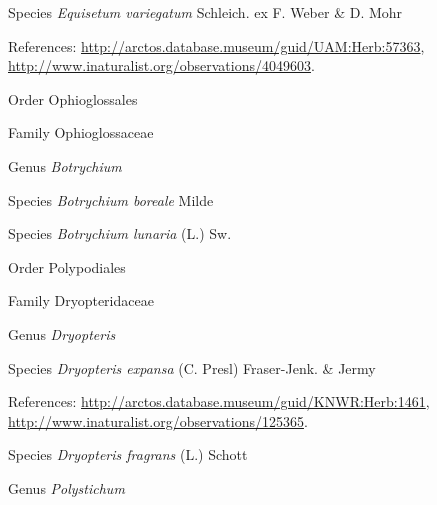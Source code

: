 \documentclass[9pt, article]{memoir}
\begin{document}
\begin{multicols}{2}
\vspace{6pt}\noindent\hspace{36pt}Species \textit{Equisetum variegatum} Schleich. ex F. Weber \& D. Mohr


\vspace{6pt}References: 
\url{http://arctos.database.museum/guid/UAM:Herb:57363}, 
\url{http://www.inaturalist.org/observations/4049603}.

\vspace{6pt}\noindent\hspace{18pt}Order Ophioglossales


\vspace{6pt}\noindent\hspace{24pt}Family Ophioglossaceae


\vspace{6pt}\noindent\hspace{30pt}Genus \textit{Botrychium}


\vspace{6pt}\noindent\hspace{36pt}Species \textit{Botrychium boreale} Milde


\vspace{6pt}\noindent\hspace{36pt}Species \textit{Botrychium lunaria} (L.) Sw.


\vspace{6pt}\noindent\hspace{18pt}Order Polypodiales


\vspace{6pt}\noindent\hspace{24pt}Family Dryopteridaceae


\vspace{6pt}\noindent\hspace{30pt}Genus \textit{Dryopteris}


\vspace{6pt}\noindent\hspace{36pt}Species \textit{Dryopteris expansa} (C. Presl) Fraser-Jenk. \& Jermy


\vspace{6pt}References: 
\url{http://arctos.database.museum/guid/KNWR:Herb:1461}, 
\url{http://www.inaturalist.org/observations/125365}.

\vspace{6pt}\noindent\hspace{36pt}Species \textit{Dryopteris fragrans} (L.) Schott


\vspace{6pt}\noindent\hspace{30pt}Genus \textit{Polystichum}



\end{multicols}
\end{document}
